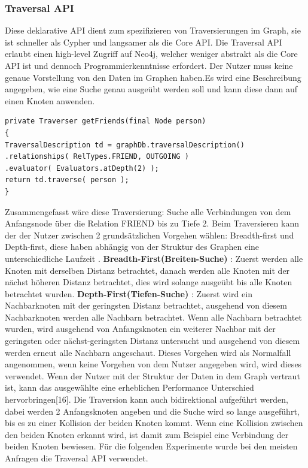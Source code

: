 \subsubsection{Traversal API}
Diese deklarative API  dient zum spezifizieren von Traversierungen im Graph, sie ist schneller als Cypher und langsamer als die Core API. Die Traversal API erlaubt einen high-level Zugriff auf Neo4j, welcher weniger abstrakt als die Core API ist und dennoch Programmierkenntnisse erfordert. Der Nutzer muss keine genaue Vorstellung von den Daten im Graphen haben.Es wird eine Beschreibung angegeben, wie eine Suche  genau ausgeübt werden soll und kann diese dann auf einen Knoten anwenden. 
\begin{Verbatim}[frame=single]
private Traverser getFriends(final Node person)
{
TraversalDescription td = graphDb.traversalDescription()
.relationships( RelTypes.FRIEND, OUTGOING )
.evaluator( Evaluators.atDepth(2) );
return td.traverse( person );
}
\end{Verbatim}
Zusammengefasst wäre diese Traversierung: Suche alle Verbindungen von dem Anfangsnode über die Relation FRIEND bis zu Tiefe 2.  Beim Traversieren kann der der Nutzer zwischen 2 grundsätzlichen Vorgehen wählen: Breadth-first und Depth-first, diese haben abhängig von der Struktur des Graphen eine unterschiedliche Laufzeit \parencite{vukotic2015neo4j}. \newline
\textbf {Breadth-First(Breiten-Suche)} : Zuerst werden alle Knoten mit derselben Distanz betrachtet, danach werden alle Knoten mit der nächst höheren Distanz betrachtet, dies wird solange ausgeübt bis alle Knoten betrachtet wurden. \newline
\textbf {Depth-First(Tiefen-Suche)} : Zuerst wird ein Nachbarknoten mit der geringsten Distanz betrachtet, ausgehend von diesem Nachbarknoten werden alle Nachbarn betrachtet. Wenn alle Nachbarn betrachtet wurden, wird ausgehend von Anfangsknoten ein weiterer Nachbar mit der geringsten oder nächst-geringsten Distanz untersucht und ausgehend von diesem werden erneut alle Nachbarn angeschaut. Dieses Vorgehen wird als Normalfall angenommen, wenn keine Vorgehen von dem Nutzer angegeben wird, wird dieses verwendet. 
\newline
\newline
Wenn der Nutzer mit der Struktur der Daten in dem Graph vertraut ist, kann das ausgewählte eine erheblichen Performance Unterschied  hervorbringen[16]. Die Traversion kann auch bidirektional aufgeführt werden, dabei werden 2 Anfangsknoten angeben und die Suche wird so lange ausgeführt, bis es zu einer Kollision der beiden Knoten kommt. Wenn eine Kollision zwischen den beiden Knoten erkannt wird, ist damit zum Beispiel eine Verbindung der beiden Knoten bewiesen. Für die folgenden Experimente wurde bei den meisten Anfragen die Traversal API verwendet. 

